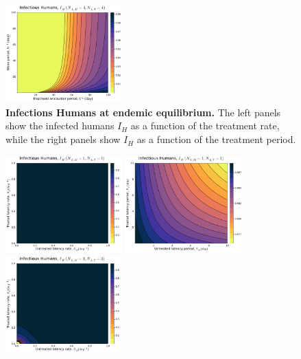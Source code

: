 \documentclass[12pt]{article}
\begin{document}
\begin{figure}[H]
    \includegraphics[width=0.4\textwidth]{../../fig/gen_model/IH_periods_txh_4x4.pdf}
    \caption{\textbf{Infections Humans at endemic equilibrium.} The left panels show the infected humans \(I_H\) as a function of the treatment rate, while the right panels show \(I_H\) as a function of the treatment period.}
\end{figure}

\begin{figure}[H]
    \centering
    \includegraphics[width=0.4\textwidth]{../../fig/gen_model/IH_rates_SMxST_1x1.pdf}
    \includegraphics[width=0.4\textwidth]{../../fig/gen_model/IH_periods_SMxST_1x1.pdf}\\
    \includegraphics[width=0.4\textwidth]{../../fig/gen_model/IH_rates_SMxST_2x2.pdf}

\end{figure}
\end{document}
